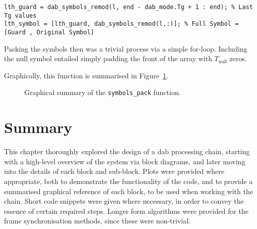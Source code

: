 \documentclass[class=report,11pt,crop=false]{standalone}
\begin{document}
\begin{lstlisting}[caption={\textsc{Matlab} code for prepending a guard interval to a symbol.},label={code:symbols_pack-1}]
lth_guard = dab_symbols_remod(l, end - dab_mode.Tg + 1 : end); % Last Tg values
lth_symbol = [lth_guard, dab_symbols_remod(l,:)]; % Full Symbol = [Guard , Original Symbol]
\end{lstlisting}

Packing the symbols then was a trivial process via a simple for-loop. Including the null symbol entailed simply padding the front of the array with \(T_\mathrm{null}\) zeros.

Graphically, this function is summarised in Figure~\ref{fig:symbols_pack}.

\begin{figure}[htbp]
  \centering
  \captionsetup{type=figure}
  \def\svgwidth{\linewidth}
  { %
  }
  \caption{Graphical summary of the \texttt{symbols\_pack} function.}
  \label{fig:symbols_pack}
\end{figure}

\section{Summary}
This chapter thoroughly explored the design of a \gls{dab} processing chain, starting with a high-level overview of the system via block diagrams, and later moving into the details of each block and sub-block. Plots were provided where appropriate, both to demonstrate the functionality of the code, and to provide a summarised graphical reference of each block, to be used when working with the chain. Short code snippets were given where necessary, in order to convey the essence of certain required steps. Longer form algorithms were provided for the frame synchronisation methods, since these were non-trivial.

\ifstandalone

\printnoidxglossary[type=\acronymtype,nonumberlist]
\fi
\end{document}
